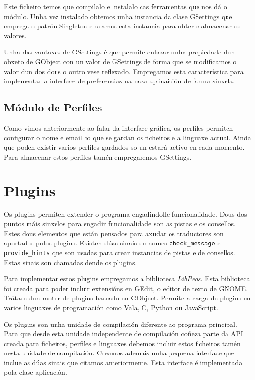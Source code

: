 Este ficheiro temos que compilalo e instalalo cas ferramentas que nos dá o módulo. Unha vez instalado obtemos unha instancia da clase GSettings que emprega o patrón Singleton e usamos esta instancia para obter e almacenar os valores.

Unha das vantaxes de GSettings é que permite enlazar unha propiedade dun obxeto de GObject con un valor de GSettings de forma que se modificamos o valor dun dos dous o outro vese reflexado. Empregamos esta característica para implementar a interface de preferencias na nosa aplicaición de forma sinxela.

\subsection{Módulo de Perfiles}
Como vimos anteriormente ao falar da interface gráfica, os perfiles permiten configurar o nome e email co que se gardan os ficheiros e a linguaxe actual. Aínda que poden existir varios perfiles gardados so un estará activo en cada momento. Para almacenar estos perfiles tamén empregaremos GSettings.

\section{Plugins}
Os plugins permiten extender o programa engadindolle funcionalidade. Dous dos puntos máis sinxelos para engadir funcionalidade son as pistas e os consellos. Estes dous elementos que están pensados para axudar os traductores son aportados polos plugins. Existen dúas sinais de nomes \lstinline{check_message} e \lstinline{provide_hints} que son usadas para crear instancias de pistas e de consellos. Estas sinais son chamadas dende os plugins.

Para implementar estos plugins empregamos a biblioteca \emph{LibPeas}. Esta biblioteca foi creada para poder incluir extensións en GEdit, o editor de texto de GNOME. Trátase dun motor de plugins baseado en GObject. Permite a carga de plugins en varios linguaxes de programación como Vala, C, Python ou JavaScript.

Os plugins son unha unidade de compilación diferente ao programa principal. Para que desde esta unidade independente de compilación coñeza parte da API creada para ficheiros, perfiles e linguaxes debemos incluir estos ficheiros tamén nesta unidade de compilación. Creamos ademais unha pequena interface que inclue as dúas sinais que citamos anteriormente. Esta interface é implementada pola clase aplicación.

